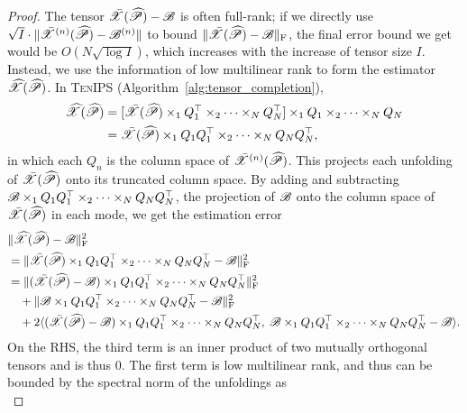 \documentclass{article}
\newcommand{\T}[2][]{#1\mathscr{\MakeUppercase{#2}}}
\newcommand{\norm}[1]{\Vert #1 \Vert}
\newcommand{\fnorm}[1]{\norm{#1}_{\mathrm{F}}}
\def\Xh{\widehat X}
\def\Ph{\widehat P}
\theoremstyle{plain}
\begin{document}
\begin{proof}
	The tensor $\bar{\T{X}}(\T{\Ph}) - \T{B}$ is often full-rank; if we directly use $\sqrt{I} \cdot \norm{\bar{\T{X}}^{(n)}(\T{\Ph}) - \T{B}^{(n)}}$ to bound $\fnorm{\bar{\T{X}}(\T{\Ph}) - \T{B}}$, the final error bound we get would be $O(N \sqrt{\log I})$, which increases with the increase of tensor size $I$. 
	Instead, we use the information of low multilinear rank to form the estimator $\T{\Xh} (\T{\Ph})$.
	In \textsc{TenIPS} (Algorithm~\ref{alg:tensor_completion}),
	\begin{equation}
		\begin{aligned}
			\T{\Xh} (\T{\Ph})& = [\bar{\T{X}}(\T{\Ph}) \times_1 Q_1^\top \times_2 \cdots \times_N Q_N^\top] \times_1 Q_1 \times_2 \cdots \times_N Q_N \\
			& = \bar{\T{X}}(\T{\Ph}) \times_1 Q_1Q_1^\top \times_2 \cdots \times_N Q_N Q_N^\top,
		\end{aligned}
		\nonumber
	\end{equation}
	in which each $Q_n$ is the column space of $\bar{\T{X}}^{(n)}(\T{\Ph})$.
	This projects each unfolding of $\bar{\T{X}} (\T{\Ph})$ onto its truncated column space. 
	By adding and subtracting $ \T{B} \times_1 Q_1Q_1^\top \times_2 \cdots \times_N Q_N Q_N^\top$, the projection of $\T{B}$ onto the column space of $\bar{\T{X}}(\T{\Ph})$ in each mode, we get the estimation error
	\begin{equation}
		\begin{aligned}
			& \fnorm{\T{\Xh}(\T{\Ph}) - \T{B}}^2 \\
			& =  \fnorm{\bar{\T{X}}(\T{\Ph}) \times_1 Q_1Q_1^\top \times_2 \cdots \times_N Q_N Q_N^\top - \T{B}}^2 \\
			& = \fnorm{(\bar{\T{X}}(\T{\Ph})-\T{B}) \times_1 Q_1Q_1^\top \times_2 \cdots \times_N Q_N Q_N^\top}^2\\
			& \quad +  \fnorm{\T{B} \times_1 Q_1Q_1^\top \times_2 \cdots \times_N Q_N Q_N^\top - \T{B}}^2\\
			& \quad +2 \langle (\bar{\T{X}}(\T{\Ph})-\T{B}) \times_1 Q_1Q_1^\top \times_2 \cdots \times_N Q_N Q_N^\top, \; \T{B} \times_1 Q_1Q_1^\top \times_2 \cdots \times_N Q_N Q_N^\top - \T{B} \rangle. \\
		\end{aligned}
		\nonumber
	\end{equation}
	On the RHS, the third term is an inner product of two mutually orthogonal tensors and is thus 0.
	The first term is low multilinear rank, and thus can be bounded by the spectral norm of the unfoldings as 
	\begin{equation}

\end{equation}
\end{proof}
\end{document}
